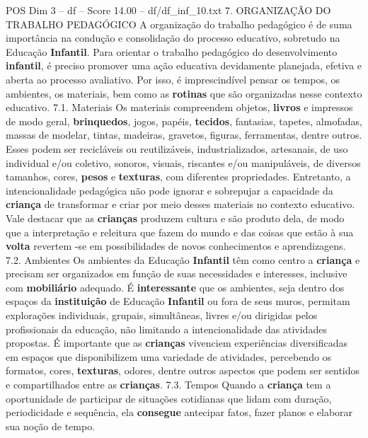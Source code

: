 \begin{textsample}{POS Dim 3 – df – Score 14.00 – df/df\_inf\_10.txt}  \label{ex:f3_pos_129}
7.
ORGANIZAÇÃO DO TRABALHO PEDAGÓGICO A organização do trabalho pedagógico é de suma importância na condução e consolidação do processo educativo, sobretudo na Educação \textbf{Infantil}.
Para orientar o trabalho pedagógico do desenvolvimento \textbf{infantil}, é preciso promover uma ação educativa devidamente planejada, efetiva e aberta ao processo avaliativo.
Por isso, é imprescindível pensar os tempos, os ambientes, os materiais, bem como as \textbf{rotinas} que são organizadas nesse contexto educativo. 7.1.
Materiais Os materiais compreendem objetos, \textbf{livros} e impressos de modo geral, \textbf{brinquedos}, jogos, papéis, \textbf{tecidos}, fantasias, tapetes, almofadas, massas de modelar, tintas, madeiras, gravetos, figuras, ferramentas, dentre outros.
Esses podem ser recicláveis ou reutilizáveis, industrializados, artesanais, de uso individual e/ou coletivo, sonoros, visuais, riscantes e/ou manipuláveis, de diversos tamanhos, cores, \textbf{pesos} e \textbf{texturas}, com diferentes propriedades.
Entretanto, a intencionalidade pedagógica não pode ignorar e sobrepujar a capacidade da \textbf{criança} de transformar e criar por meio desses materiais no contexto educativo.
Vale destacar que as \textbf{crianças} produzem cultura e são produto dela, de modo que a interpretação e releitura que fazem do mundo e das coisas que estão à sua \textbf{volta} revertem -se em possibilidades de novos conhecimentos e aprendizagens. 7.2.
Ambientes Os ambientes da Educação \textbf{Infantil} têm como centro a \textbf{criança} e precisam ser organizados em função de suas necessidades e interesses, inclusive com \textbf{mobiliário} adequado.
É \textbf{interessante} que os ambientes, seja dentro dos espaços da \textbf{instituição} de Educação \textbf{Infantil} ou fora de seus muros, permitam explorações individuais, grupais, simultâneas, livres e/ou dirigidas pelos profissionais da educação, não limitando a intencionalidade das atividades propostas.
É importante que as \textbf{crianças} vivenciem experiências diversificadas em espaços que disponibilizem uma variedade de atividades, percebendo os formatos, cores, \textbf{texturas}, odores, dentre outros aspectos que podem ser sentidos e compartilhados entre as \textbf{crianças}. 7.3.
Tempos Quando a \textbf{criança} tem a oportunidade de participar de situações cotidianas que lidam com duração, periodicidade e sequência, ela \textbf{consegue} antecipar fatos, fazer planos e elaborar sua noção de tempo.

\end{textsample}
